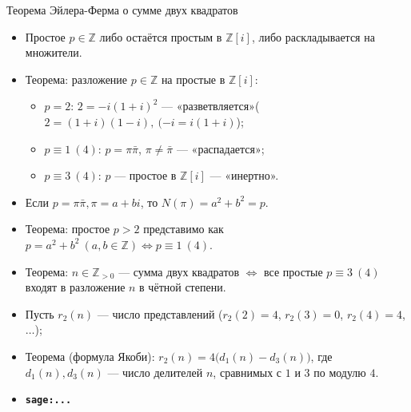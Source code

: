 \documentclass[serif, aspectratio=169]{beamer}
\newcommand{\sagemark}{%
  \textcolor{green!40!black}{\textbf{\texttt{sage:...}}}%
}
\begin{document}
\begin{frame}{Теорема Эйлера-Ферма о сумме двух квадратов}
    \begin{itemize}
        \item Простое $p\in\mathbb{Z}$ либо остаётся простым в $\mathbb{Z}[i]$, либо раскладывается на множители.
        \item Теорема: разложение $p\in\mathbb{Z}$ на простые в $\mathbb{Z}[i]$:
        \begin{itemize}
            \item $p=2$: $2=-i(1+i)^2$ --- «разветвляется»\quad ($2=(1+i)(1-i),\ (-i=i(1+i)$);
            \item $p\equiv1\ (4)$: $p=\pi\bar\pi$, $\pi\ne\bar\pi$ --- «распадается»;
            \item $p\equiv3\ (4)$: $p$ --- простое в $\mathbb{Z}[i]$ --- «инертно».
        \end{itemize}
        \item Если $p=\pi\bar\pi, \pi=a+bi$, то $N(\pi)=a^2+b^2=p$.
        \item Теорема: простое $p>2$ представимо как $p=a^2+b^2\ (a,b\in\mathbb{Z}) \Leftrightarrow p\equiv1\ (4)$.
        \item Теорема: $n\in\mathbb{Z}_{> 0}$ --- сумма двух квадратов $\Leftrightarrow$ все простые $p\equiv3\ (4)$ входят в разложение $n$ в чётной степени.
        \item Пусть $r_2(n)$ --- число представлений ($r_2(2)=4$, $r_2(3)=0$, $r_2(4)=4$, $\dots$);
        \item Теорема (формула Якоби): $r_2(n) = 4\big(d_1(n)-d_3(n)\big)$, где $d_1(n), d_3(n)$ --- число делителей $n$, сравнимых с $1$ и $3$ по модулю $4$.
        \item \sagemark
    \end{itemize}
\end{frame}
\end{document}

